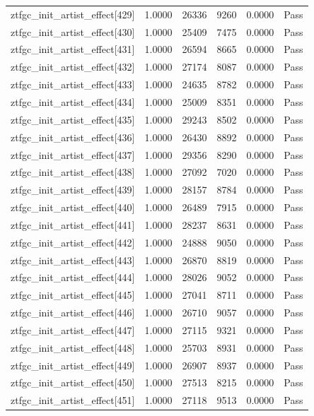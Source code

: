 \begin{table}[htbp]
\begin{tabular}{llrrll}
ztfgc\_init\_artist\_effect[429] & 1.0000 & 26336 & 9260 & 0.0000 & Pass \\
ztfgc\_init\_artist\_effect[430] & 1.0000 & 25409 & 7475 & 0.0000 & Pass \\
ztfgc\_init\_artist\_effect[431] & 1.0000 & 26594 & 8665 & 0.0000 & Pass \\
ztfgc\_init\_artist\_effect[432] & 1.0000 & 27174 & 8087 & 0.0000 & Pass \\
ztfgc\_init\_artist\_effect[433] & 1.0000 & 24635 & 8782 & 0.0000 & Pass \\
ztfgc\_init\_artist\_effect[434] & 1.0000 & 25009 & 8351 & 0.0000 & Pass \\
ztfgc\_init\_artist\_effect[435] & 1.0000 & 29243 & 8502 & 0.0000 & Pass \\
ztfgc\_init\_artist\_effect[436] & 1.0000 & 26430 & 8892 & 0.0000 & Pass \\
ztfgc\_init\_artist\_effect[437] & 1.0000 & 29356 & 8290 & 0.0000 & Pass \\
ztfgc\_init\_artist\_effect[438] & 1.0000 & 27092 & 7020 & 0.0000 & Pass \\
ztfgc\_init\_artist\_effect[439] & 1.0000 & 28157 & 8784 & 0.0000 & Pass \\
ztfgc\_init\_artist\_effect[440] & 1.0000 & 26489 & 7915 & 0.0000 & Pass \\
ztfgc\_init\_artist\_effect[441] & 1.0000 & 28237 & 8631 & 0.0000 & Pass \\
ztfgc\_init\_artist\_effect[442] & 1.0000 & 24888 & 9050 & 0.0000 & Pass \\
ztfgc\_init\_artist\_effect[443] & 1.0000 & 26870 & 8819 & 0.0000 & Pass \\
ztfgc\_init\_artist\_effect[444] & 1.0000 & 28026 & 9052 & 0.0000 & Pass \\
ztfgc\_init\_artist\_effect[445] & 1.0000 & 27041 & 8711 & 0.0000 & Pass \\
ztfgc\_init\_artist\_effect[446] & 1.0000 & 26710 & 9057 & 0.0000 & Pass \\
ztfgc\_init\_artist\_effect[447] & 1.0000 & 27115 & 9321 & 0.0000 & Pass \\
ztfgc\_init\_artist\_effect[448] & 1.0000 & 25703 & 8931 & 0.0000 & Pass \\
ztfgc\_init\_artist\_effect[449] & 1.0000 & 26907 & 8937 & 0.0000 & Pass \\
ztfgc\_init\_artist\_effect[450] & 1.0000 & 27513 & 8215 & 0.0000 & Pass \\
ztfgc\_init\_artist\_effect[451] & 1.0000 & 27118 & 9513 & 0.0000 & Pass \\

\end{tabular}
\end{table}
